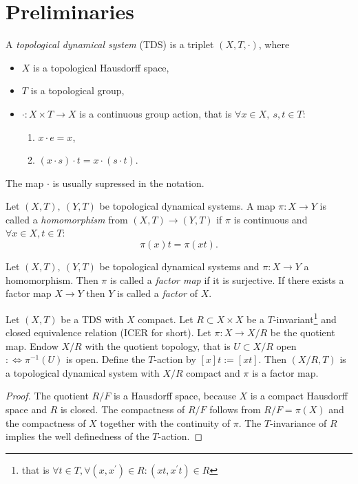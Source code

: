 \section{Preliminaries}
\begin{definition}
  A \emph{topological dynamical system} (TDS) is a triplet $(X,T,\cdot)$, where
  \begin{itemize}
    \item $X$ is a topological Hausdorff space,
    \item $T$ is a topological group,
    \item $\cdot : X \times T \to X$ is a continuous group action, that is $\forall x \in X, \ s,t \in T$: 
    \begin{enumerate}
      \item $ x\cdot e = x$,
      \item $(x\cdot s)\cdot t = x \cdot (s \cdot t)$.
    \end{enumerate}
  \end{itemize}
\end{definition}
\begin{remark}
  The map $\cdot$ is usually supressed in the notation.
\end{remark}

\begin{definition}
  Let $(X,T), \ (Y,T)$ be topological dynamical systems.
  A map $\pi : X \to Y$ is called a \emph{homomorphism} from $(X,T) \to (Y,T)$ if $\pi$ is continuous and $\forall x \in X, t \in T$:
  \begin{equation*}
     \pi (x)   t = \pi ( x t).
  \end{equation*}
\end{definition}
\begin{definition}
   Let $(X,T), \ (Y,T)$ be topological dynamical systems and $\pi: X \to Y$ a homomorphism.
   Then $\pi$ is called a \emph{factor map} if it is surjective.
   If there exists a factor map $X \to Y$ then $Y$ is called a \emph{factor} of $X$.
\end{definition}

\begin{proposition}
  Let $(X,T)$ be a TDS with $X$ compact. Let $R \subset X \times X$ be a $T$-invariant\footnote{that is $\forall t \in T, \forall (x,x^\prime ) \in R : (xt ,x^\prime t) \in R$} and closed equivalence relation (ICER for short).
  Let $\pi : X \to X/R$ be the quotient map.
  Endow $X/R$ with the quotient topology, that is $U \subset X/R$ open $: \Leftrightarrow \pi^{-1}(U)$ is open.
  Define the $T$-action by $[x] t := [x t]$.
  Then $(X/R, T)$ is a topological dynamical system with $X/R$ compact and $\pi$ is a factor map.
\end{proposition}
\begin{proof}
 The quotient $R/F$ is a Hausdorff space, because $X$ is a compact Hausdorff space and $R$ is closed.
 The compactness of $R/F$ follows from $R/F = \pi (X)$ and the compactness of $X$ together with the continuity of $\pi$. The $T$-invariance of $R$ implies the well definedness of the $T$-action.
\end{proof}

